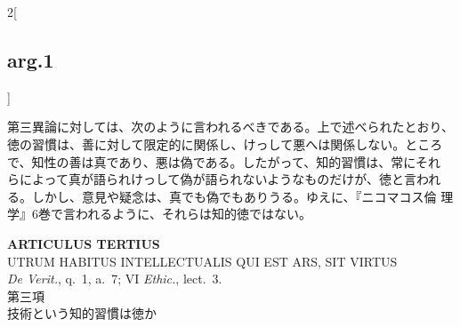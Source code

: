 \documentclass[paper=a4paper,fontsize=10pt,jafontsize=9pt,titlepage]{jlreq}
\begin{document}
\begin{paracol}{2}[\subsection{arg.1}]
\switchcolumn

第三異論に対しては、次のように言われるべきである。上で述べられたとおり、
徳の習慣は、善に対して限定的に関係し、けっして悪へは関係しない。ところ
で、知性の善は真であり、悪は偽である。したがって、知的習慣は、常にそれ
らによって真が語られけっして偽が語られないようなものだけが、徳と言われ
る。しかし、意見や疑念は、真でも偽でもありうる。ゆえに、『ニコマコス倫
理学』6巻で言われるように、それらは知的徳ではない。

\end{paracol}

\newpage

{}
\setcounter{section}{3}
\setcounter{subsection}{0}
\begin{center}
 {\Large {\bfseries ARTICULUS TERTIUS}}\\ {\large UTRUM HABITUS
 INTELLECTUALIS QUI EST ARS, SIT VIRTUS}\\ {\footnotesize {\itshape De
 Verit.}, q.~1, a.~7; VI {\itshape Ethic.}, lect.~3.}\\ {\Large 第三項
 \\技術という知的習慣は徳か}
\end{center}
\end{document}
